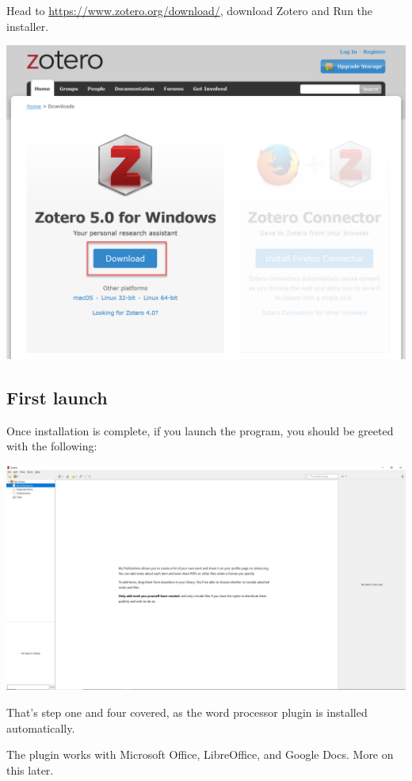 \documentclass[
]{book}
\begin{document}
Head to \url{https://www.zotero.org/download/}, download Zotero and Run the installer.

\includegraphics{images/Z_DownloadZotero.png}

\hypertarget{first-launch}{%
\subsection*{First launch}\label{first-launch}}

Once installation is complete, if you launch the program, you should be greeted with the following:

\includegraphics{images/Z_FirstLaunch.png}

That's step one and four covered, as the word processor plugin is installed automatically.

The plugin works with Microsoft Office, LibreOffice, and Google Docs. More on this later.
\end{document}
